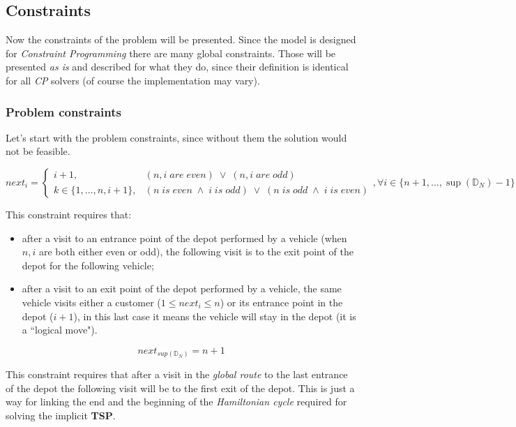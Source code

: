 \documentclass[../main.tex]{subfiles}
\begin{document}
\subsection{Constraints}
Now the constraints of the problem will be presented. Since the model is designed for \textit{Constraint Programming} there are many global constraints.
Those will be presented \textit{as is} and described for what they do, since their definition is identical for all \textit{CP} solvers (of course the implementation may vary).
\subsubsection{Problem constraints}
Let's start with the problem constraints, since without them the solution would not be feasible.\\
\begin{center}
    \begin{equation}
        next_i =
        \begin{cases}
            i+1, & (\text{$n, i$} \; are \; even) \; \vee \; (\text{$n, i$} \; are \; odd)\\
            \text{$k \in\{1, \dots, n, i+1\}$}, & (\text{$n$} \; is \; even \; \wedge \; \text{$i$} \; is \; odd ) \; \vee \; (\text{$n$} \; is \; odd \; \wedge \; \text{$i$} \; is \; even )
        \end{cases},
        \forall i \in \{n+1,\dots,\sup{}(\mathbb{D}_N) - 1\}
    \end{equation}
\end{center}
This constraint requires that:
\begin{itemize}
    \item after a visit to an entrance point of the depot performed by a vehicle (when $n, i$ are both either even or odd), the following visit is to the exit point of the depot for the following vehicle;
    \item after a visit to an exit point of the depot performed by a vehicle, the same vehicle visits either a customer ($1 \leq next_i \leq n$) or its entrance point in the depot ($i+1$), in this last case it means the vehicle will stay in the depot (it is a ``logical move").
\end{itemize}

\begin{center}
    \begin{equation}
        next_{sup(\mathbb{D}_N)} = n+1
    \end{equation}
\end{center}
This constraint requires that after a visit in the \textit{global route} to the last entrance of the depot the following visit will be to the first exit of the depot. This is just a way for linking the end and the beginning of the \textit{Hamiltonian cycle} required for solving the implicit \textbf{TSP}.
\end{document}
